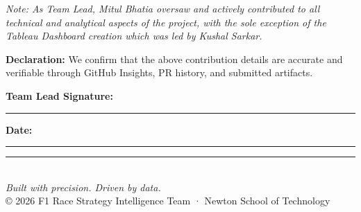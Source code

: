 \documentclass[12pt, a4paper]{article}
\begin{document}
\vspace{0.5cm}
\noindent\textit{Note: As Team Lead, Mitul Bhatia oversaw and actively contributed to all technical and analytical aspects of the project, with the sole exception of the Tableau Dashboard creation which was led by Kushal Sarkar.}

\vspace{1cm}

\noindent\textbf{Declaration:} We confirm that the above contribution details are accurate and verifiable through GitHub Insights, PR history, and submitted artifacts.

\vspace{1.5cm}

\noindent\textbf{Team Lead Signature:} \rule{8cm}{0.4pt} \hfill \textbf{Date:} \rule{4cm}{0.4pt}

\vspace{3cm}

\begin{center}
\rule{0.4\textwidth}{0.5pt}\\[0.3cm]
{\small\textit{Built with precision. Driven by data.}}\\[0.2cm]
{\footnotesize © 2026 F1 Race Strategy Intelligence Team · Newton School of Technology}
\end{center}
\end{document}
